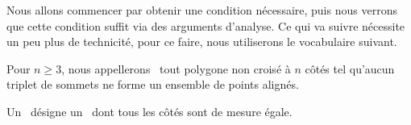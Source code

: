 Nous allons commencer par obtenir une condition nécessaire, puis nous verrons que cette condition suffit via des arguments d'analyse.
Ce qui va suivre nécessite un peu plus de technicité, pour ce faire, nous utiliserons le vocabulaire suivant.




\begin{defi}
	Pour $n \geq 3$, nous appellerons \og \emph{\ngone} \fg\ tout polygone non croisé à $n$ côtés tel qu'aucun triplet de sommets ne forme un ensemble de points alignés.
\end{defi}


\begin{defi}
	Un \og \emph{\niso} \fg\ désigne un \ngone\ dont tous les côtés sont de mesure égale.
\end{defi}
